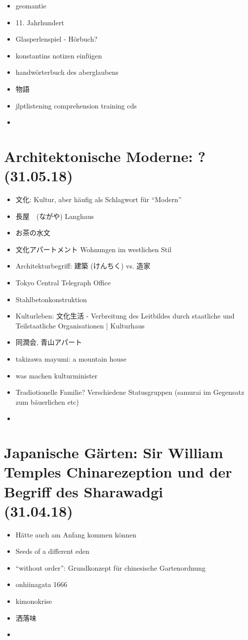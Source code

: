 \documentclass[emulatestandardclasses]{scrartcl}
\begin{document}
\begin{itemize}
  \item geomantie
  \item 11. Jahrhundert
  \item Glasperlenspiel - Hörbuch?
  \item konstantins notizen einfügen
  \item handwörterbuch des aberglaubens
  \item 物語
  \item jlptlistening comprehension training cds
  \item 
\end{itemize}



\section{Architektonische Moderne: ?\\(31.05.18)}

\begin{itemize}
  \item 文化: Kultur, aber häufig als Schlagwort für "`Modern"'
  \item 長屋　(ながや) Langhaus
  \item お茶の水文
  \item 文化アパートメント Wohnungen im westlichen Stil 
  \item Architekturbegriff: 建築 (けんちく) vs. 造家
  \item Tokyo Central Telegraph Office
  \item Stahlbetonkonstruktion
  \item Kulturleben: 文化生活 - Verbreitung des Leitbildes durch staatliche und Teilstaatliche Organisationen | Kulturhaus
  \item 同潤会, 青山アパート
  \item takizawa mayumi: a mountain house
  \item was machen kulturminister
  \item Tradiotionelle Familie? Verschiedene Statusgruppen (samurai im Gegensatz zum bäuerlichen etc)
  \item 
\end{itemize}

\section{Japanische Gärten: Sir William Temples Chinarezeption und der Begriff des Sharawadgi
\\(31.04.18)}

\begin{itemize}
  \item Hätte auch am Anfang kommen können
  \item Seeds of a different eden
  \item "`without order"': Grundkonzept für chinesische Gartenordnung
  \item onhiinagata 1666
  \item kimonokrise
  \item 洒落味
  \item 
\end{itemize}
\end{document}
